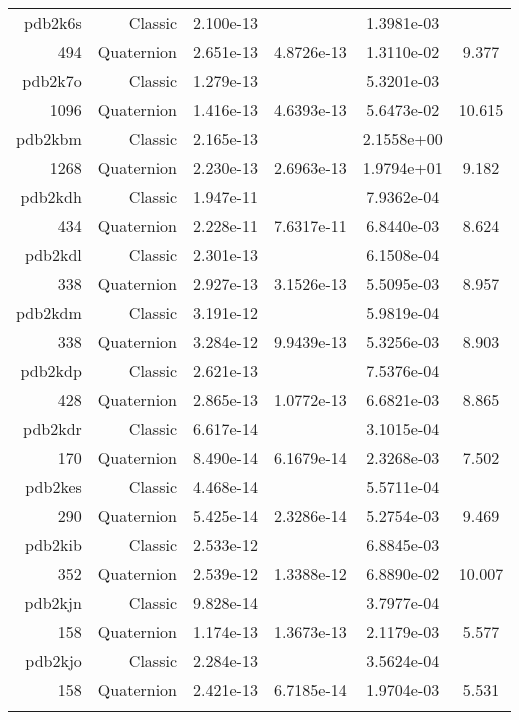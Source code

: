 \begin{xltabular}{\textwidth}{r|rS[table-format=1.3e+2]S[table-format=1.4e+2]S[table-format=1.4e+2]S[table-format=-1.3]}
pdb2k6s & Classic & 2.100e-13 &  & 1.3981e-03 & \\
494 & Quaternion & 2.651e-13 & 4.8726e-13 & 1.3110e-02 & 9.377\\  \addlinespace
pdb2k7o & Classic & 1.279e-13 &  & 5.3201e-03 & \\
1096 & Quaternion & 1.416e-13 & 4.6393e-13 & 5.6473e-02 & 10.615\\  \addlinespace
pdb2kbm & Classic & 2.165e-13 &  & 2.1558e+00 & \\
1268 & Quaternion & 2.230e-13 & 2.6963e-13 & 1.9794e+01 & 9.182\\  \addlinespace
pdb2kdh & Classic & 1.947e-11 &  & 7.9362e-04 & \\
434 & Quaternion & 2.228e-11 & 7.6317e-11 & 6.8440e-03 & 8.624\\  \addlinespace
pdb2kdl & Classic & 2.301e-13 &  & 6.1508e-04 & \\
338 & Quaternion & 2.927e-13 & 3.1526e-13 & 5.5095e-03 & 8.957\\  \addlinespace
pdb2kdm & Classic & 3.191e-12 &  & 5.9819e-04 & \\
338 & Quaternion & 3.284e-12 & 9.9439e-13 & 5.3256e-03 & 8.903\\  \addlinespace
pdb2kdp & Classic & 2.621e-13 &  & 7.5376e-04 & \\
428 & Quaternion & 2.865e-13 & 1.0772e-13 & 6.6821e-03 & 8.865\\  \addlinespace
pdb2kdr & Classic & 6.617e-14 &  & 3.1015e-04 & \\
170 & Quaternion & 8.490e-14 & 6.1679e-14 & 2.3268e-03 & 7.502\\  \addlinespace
pdb2kes & Classic & 4.468e-14 &  & 5.5711e-04 & \\
290 & Quaternion & 5.425e-14 & 2.3286e-14 & 5.2754e-03 & 9.469\\  \addlinespace
pdb2kib & Classic & 2.533e-12 &  & 6.8845e-03 & \\
352 & Quaternion & 2.539e-12 & 1.3388e-12 & 6.8890e-02 & 10.007\\  \addlinespace
pdb2kjn & Classic & 9.828e-14 &  & 3.7977e-04 & \\
158 & Quaternion & 1.174e-13 & 1.3673e-13 & 2.1179e-03 & 5.577\\  \addlinespace
pdb2kjo & Classic & 2.284e-13 &  & 3.5624e-04 & \\
158 & Quaternion & 2.421e-13 & 6.7185e-14 & 1.9704e-03 & 5.531\\  \addlinespace

\end{xltabular}
